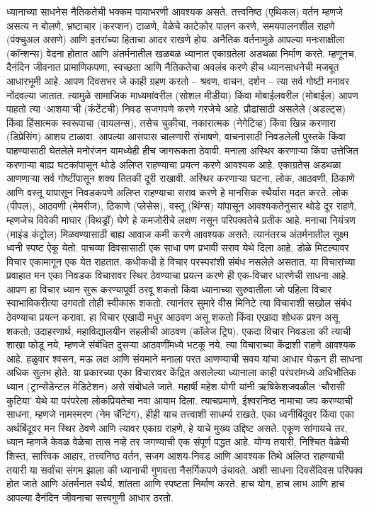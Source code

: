 ध्यानाच्या साधनेस नैतिकतेची भक्कम पायाभरणी आवश्यक असते. तत्त्वनिष्ठ (एथिकल) वर्तन म्हणजे असत्य न बोलणे, भ्रष्टाचार (करप्शन) टाळणे, वेळेचे काटेकोर पालन करणे, समयपालनशील राहणे (पंक्चुअल असणे) आणि इतरांच्या हिताचा आदर राखणे होय. अनैतिक वर्तनामुळे आपल्या मनःसाक्षीला (कॉन्शन्स) वेदना होतात आणि अंतर्मनातील खळबळ ध्यानात एकाग्रतेला अडथळा निर्माण करते. म्हणूनच, दैनंदिन जीवनात प्रामाणिकपणा, स्वच्छता आणि नैतिकतेचा अवलंब करणे हीच ध्यानसाधनेची मजबूत आधारभूमी आहे.
आपण दिवसभर जे काही ग्रहण करतो – श्रवण, वाचन, दर्शन – त्या सर्व गोष्टी मनावर नोंदवल्या जातात. त्यामुळे सामाजिक माध्यमांवरील (सोशल मीडीया) किंवा मोबाईलवरील (मोबाईल) आपण पाहतो त्या ‘आशया’ची (कंटेंटची) निवड सजगपणे करणे गरजेचे आहे. प्रौढांसाठी असलेले (अडल्ट्स) किंवा हिंसात्मक स्वरूपाचा (वायलन्स), तसेच चुकीचा, नकारात्मक (नेगेटिव्ह) किंवा खिन्न करणारा (डिप्रेसिंग) आशय टाळावा. आपल्या आसपास चालणारी संभाषणे, वाचनासाठी निवडलेली पुस्तके किंवा पाहण्यासाठी घेतलेले मनोरंजन यामध्येही हीच जागरूकता ठेवावी. मनाला अस्थिर करणाऱ्या किंवा उत्तेजित करणाऱ्या बाह्य घटकांपासून थोडे अलिप्त राहण्याचा प्रयत्न करणे आवश्यक आहे.
एकाग्रतेस अडथळा आणणाऱ्या सर्व गोष्टींपासून शक्य तितकी दूरी राखावी. अस्थिर करणाऱ्या घटना, लोक, आठवणी, ठिकाणे आणि वस्तू यापासून निवडकपणे अलिप्त राहण्याचा सराव करणे हे मानसिक स्थैर्यास मदत करते. लोक (पीपल), आठवणी (मेमरीज), ठिकाणे (प्लेसेस), वस्तू (थिंग्स) यांपासून आवश्यकतेनुसार थोडे दूर राहणे, म्हणजेच विवेकी माघार (विथड्रॉ) घेणे हे कमजोरीचे लक्षण नसून परिपक्वतेचे प्रतीक आहे. मनाचा नियंत्रण (माइंड कंट्रोल) मिळवण्यासाठी बाह्य आवाज कमी करणे आवश्यक असते; त्यानंतरच अंतर्मनातील सूक्ष्म ध्वनी स्पष्ट ऐकू येतो.
पाचव्या दिवसासाठी एक साधा पण प्रभावी सराव येथे दिला आहे. डोळे मिटल्यावर विचार एकामागून एक येत राहतात. कधीकधी हे विचार परस्परांशी संबंध नसलेले असतात. या विचारांच्या प्रवाहात मन एका निवडक विचारावर स्थिर ठेवण्याचा प्रयत्न करणे ही एक-विचार धारणेची साधना आहे. आपण हा विचार ध्यान सुरू करण्यापूर्वी ठरवू शकतो किंवा ध्यानाच्या सुरुवातीला जो पहिला विचार स्वाभाविकरीत्या उगवतो तोही स्वीकारू शकतो. त्यानंतर सुमारे वीस मिनिटे त्या विचाराशी सखोल संबंध ठेवण्याचा प्रयत्न करावा. हा विचार एखादी मधुर आठवण असू शकतो किंवा एखादा शोधक प्रश्न असू शकतो; उदाहरणार्थ, महाविद्यालयीन सहलीची आठवण (कॉलेज ट्रिप). एकदा विचार निवडला की त्याची शाखा फोडू नये, म्हणजे संबंधित दुसऱ्या आठवणींमध्ये भटकू नये. त्या विचाराच्या केंद्राशी राहणे आवश्यक आहे. हळुवार श्वसन, मऊ लक्ष आणि संयमाने मनाला परत आणण्याची सवय यांचा आधार घेऊन ही साधना अधिक सुलभ होते.
या प्रकारच्या एका विचारावर केंद्रित असलेल्या ध्यानाला काही परंपरांमध्ये अधिभौतिक ध्यान (ट्रान्सेंडेन्टल मेडिटेशन) असे संबोधले जाते. महार्षी महेश योगी यांनी ऋषिकेशजवळील ‘चौरासी कुटिया’ येथे या परंपरेला लोकप्रियतेचा नवा आयाम दिला. त्याचप्रमाणे, ईश्वरनिष्ठ नामाचा जप करण्याची साधना, म्हणजे नामस्मरण (नेम चॅन्टिंग), हीही याच तत्त्वाशी साधर्म्य राखते. एका ध्वनीबिंदूवर किंवा एका अर्थबिंदूवर मन स्थिर ठेवणे आणि त्यावर एकाग्र राहणे, हे याचे मुख्य उद्दिष्ट असते.
एकूण सांगायचे तर, ध्यान म्हणजे केवळ वेळेचा तास नव्हे तर जगण्याची एक संपूर्ण पद्धत आहे. योग्य तयारी, निश्चित वेळेची शिस्त, सात्त्विक आहार, तत्त्वनिष्ठ वर्तन, सजग आशय-निवड आणि आवश्यक तिथे अलिप्त राहण्याची तयारी या सर्वांचा संगम झाला की ध्यानाची गुणवत्ता नैसर्गिकपणे उंचावते. अशी साधना दिवसेंदिवस परिपक्व होत जाते आणि अंतर्मनात स्थैर्य, शांतता आणि स्पष्टता निर्माण करते. हाच योग, हाच लाभ आणि हाच आपल्या दैनंदिन जीवनाचा सत्त्वगुणी आधार ठरतो.

